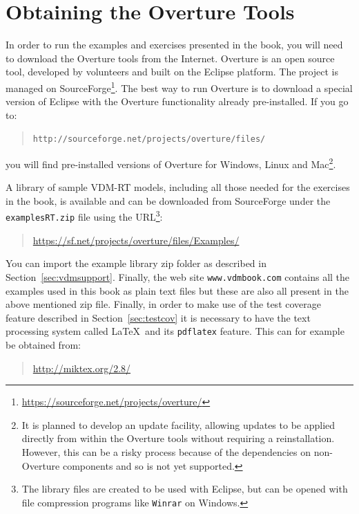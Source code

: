 \section{Obtaining the Overture Tools}\label{sec:install}

In order to run the examples and exercises presented in the book, you
will need to download the Overture tools from the Internet.
Overture is an open source tool, developed by volunteers and built on
the Eclipse platform. The project is managed on
SourceForge\footnote{\url{https://sourceforge.net/projects/overture/}}.
The best way to run Overture is to download a special version of
Eclipse with the Overture functionality already pre-installed. If you
go to:
  \begin{quote}
  \texttt{http://sourceforge.net/projects/overture/files/}
  \end{quote}
  \noindent you will find pre-installed versions of Overture for
  Windows, Linux and Mac\footnote{It is planned to develop an update
    facility, allowing updates to be applied directly from within the
    Overture tools without requiring a reinstallation. However, this
    can be a risky process because of the dependencies on non-Overture
    components and so is not yet supported.}.

A library of sample VDM-RT models, including all those needed
for the exercises in the book, is available and can be downloaded from
SourceForge under the \texttt{examplesRT.zip} file using the
URL\footnote{The library files are created to be used with Eclipse,
  but can be opened with file compression programs like \texttt{Winrar} on
  Windows.}:
\begin{quote}
\url{https://sf.net/projects/overture/files/Examples/}
\end{quote}
You can import the example library zip folder as described in
Section~\ref{sec:vdmsupport}.  Finally, the web site
\texttt{www.vdmbook.com} contains all the examples used in this book
as plain text files but these are also all present in the above
mentioned zip file. Finally, in order to make use of the
test coverage feature described in Section~\ref{sec:testcov} it is
necessary to have the text processing system called \LaTeX\ and its
\texttt{pdflatex} feature. This can for example be obtained from:
\begin{quote}
\url{http://miktex.org/2.8/}
\end{quote}

